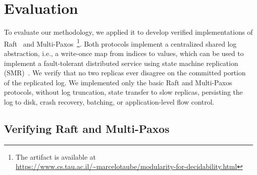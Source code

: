 \section{Evaluation}

To evaluate our methodology, we applied it to develop verified implementations
of Raft~\cite{raft} and Multi-Paxos~\cite{paxos}\footnote{The artifact is available at \url{https://www.cs.tau.ac.il/~marcelotaube/modularity-for-decidability.html}}.
%
Both protocols implement a centralized shared log abstraction, i.e., a write-once map from
indices %
to values, which can be used to
implement a fault-tolerant distributed service using state
machine replication (SMR)~\cite{schneider_implementing_1990}.
We verify that no two replicas ever disagree
on the committed portion of the replicated log.
%
We implemented only the basic Raft and Multi-Paxos protocols, without
 log truncation, state transfer to slow replicas,
persisting the log to disk, crash recovery, batching, or
application-level flow control. 




\subsection{Verifying Raft and Multi-Paxos}
